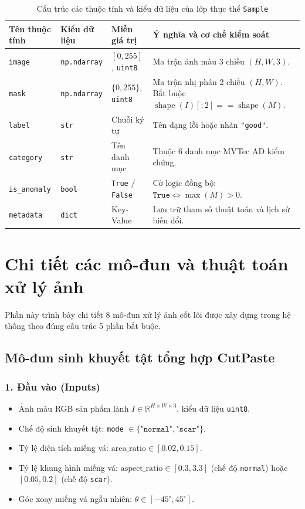 \begin{table}[h]
\centering
\caption{Cấu trúc các thuộc tính và kiểu dữ liệu của lớp thực thể \texttt{Sample}}
\label{tab:sample_structure}
\begin{tabularx}{\textwidth}{l l p{3.2cm} X}
\toprule
\textbf{Tên thuộc tính} & \textbf{Kiểu dữ liệu} & \textbf{Miền giá trị} & \textbf{Ý nghĩa và cơ chế kiểm soát} \\
\midrule
\texttt{image} & \texttt{np.ndarray} & $[0, 255]$, \texttt{uint8} & Ma trận ảnh màu 3 chiều $(H, W, 3)$. \\
\texttt{mask} & \texttt{np.ndarray} & $\{0, 255\}$, \texttt{uint8} & Ma trận nhị phân 2 chiều $(H, W)$. Bắt buộc $\operatorname{shape}(I)[:2] == \operatorname{shape}(M)$. \\
\texttt{label} & \texttt{str} & Chuỗi ký tự & Tên dạng lỗi hoặc nhãn \texttt{"good"}. \\
\texttt{category} & \texttt{str} & Tên danh mục & Thuộc 6 danh mục MVTec AD kiểm chứng. \\
\texttt{is\_anomaly} & \texttt{bool} & \texttt{True} / \texttt{False} & Cờ logic đồng bộ: $\texttt{True} \iff \max(M) > 0$. \\
\texttt{metadata} & \texttt{dict} & Key-Value & Lưu trữ tham số thuật toán và lịch sử biến đổi. \\
\bottomrule
\end{tabularx}
\end{table}

\section{Chi tiết các mô-đun và thuật toán xử lý ảnh}

Phần này trình bày chi tiết 8 mô-đun xử lý ảnh cốt lõi được xây dựng trong hệ thống theo đúng cấu trúc 5 phần bắt buộc.

\subsection{Mô-đun sinh khuyết tật tổng hợp CutPaste}

\subsubsection*{1. Đầu vào (Inputs)}
\begin{itemize}
    \item Ảnh màu RGB sản phẩm lành $I \in \mathbb{R}^{H \times W \times 3}$, kiểu dữ liệu \texttt{uint8}.
    \item Chế độ sinh khuyết tật: \texttt{mode} $\in \{\texttt{"normal"}, \texttt{"scar"}\}$.
    \item Tỷ lệ diện tích miếng vá: $\text{area\_ratio} \in [0.02, 0.15]$.
    \item Tỷ lệ khung hình miếng vá: $\text{aspect\_ratio} \in [0.3, 3.3]$ (chế độ \texttt{normal}) hoặc $[0.05, 0.2]$ (chế độ \texttt{scar}).
    \item Góc xoay miếng vá ngẫu nhiên: $\theta \in [-45^\circ, 45^\circ]$.
\end{itemize}

